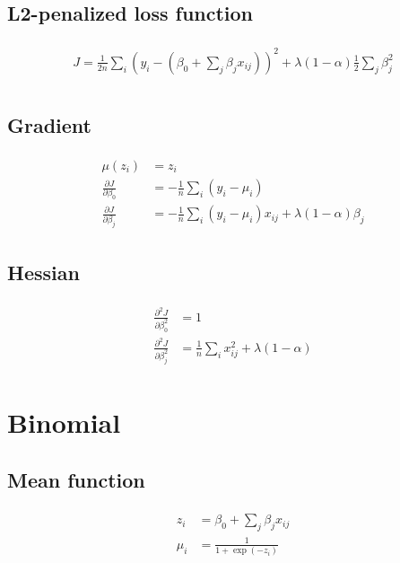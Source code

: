 \documentclass[a4paper]{article}
\begin{document}
\subsection{L2-penalized loss function}
\def \normalloss{
\begin{align}
\begin{split}
J = \frac{1}{2n}\sum_i (y_i - (\beta_0 + \sum_j \beta_j x_{ij}))^2 + \lambda (1 - \alpha) \frac{1}{2}\sum_j \beta_j^2\\
\end{split}
\end{align}
}
\normalloss

\subsection{Gradient}
\def \normalgrad{
\begin{align}
\begin{split}
\mu(z_i) &= z_i \\
\frac{\partial J}{\partial \beta_0} &= -\frac{1}{n}\sum_i (y_i - \mu_i) \\
\frac{\partial J}{\partial \beta_j} &= -\frac{1}{n}\sum_i (y_i - \mu_i) x_{ij}
+ \lambda (1 - \alpha) \beta_j 
\end{split}
\end{align}}
\normalgrad

\subsection{Hessian}
\def \normalhess{
\begin{align}
\begin{split}
\frac{\partial^2 J}{\partial \beta_0^2} &= 1 \\
\frac{\partial^2 J}{\partial \beta_j^2} &=  \frac{1}{n}\sum_i x_{ij}^2
+ \lambda (1 - \alpha)
\end{split}
\end{align}}
\normalhess

\section{Binomial}

\subsection{Mean function}
\def \binomialmean{
\begin{align}
\begin{split}
z_i &= \beta_0 + \sum_j \beta_j x_{ij} \\
\mu_i &= \frac{1}{1+\exp(-z_i)}
\end{split}
\end{align}
}
\binomialmean
\end{document}
